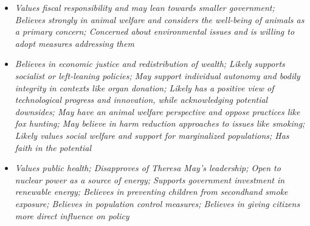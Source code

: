 \documentclass[11pt]{article}
\newcommand{\profiletext}[1]{\textit{#1}}
\begin{document}
\begin{itemize}
\item \profiletext{Values fiscal responsibility and may lean towards smaller government; Believes strongly in animal welfare and considers the well-being of animals as a primary concern; Concerned about environmental issues and is willing to adopt measures addressing them}
\item \profiletext{Believes in economic justice and redistribution of wealth; Likely supports socialist or left-leaning policies; May support individual autonomy and bodily integrity in contexts like organ donation; Likely has a positive view of technological progress and innovation, while acknowledging potential downsides; May have an animal welfare perspective and oppose practices like fox hunting; May believe in harm reduction approaches to issues like smoking; Likely values social welfare and support for marginalized populations; Has faith in the potential}
\item \profiletext{Values public health; Disapproves of Theresa May's leadership; Open to nuclear power as a source of energy; Supports government investment in renewable energy; Believes in preventing children from secondhand smoke exposure; Believes in population control measures; Believes in giving citizens more direct influence on policy}
\end{itemize}
\end{document}
